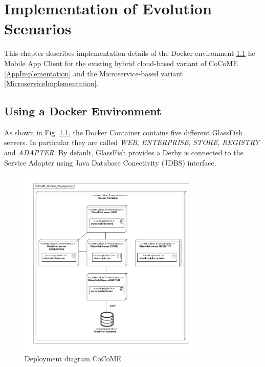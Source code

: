 \chapter{Implementation of Evolution Scenarios}
\label{c:implementation}
This chapter describes implementation details of the Docker environment \ref{DockerImplementation}\deleted{,} 
he Mobile App Client for the existing hybrid cloud-based variant of CoCoME \deleted{(}\ref{AppImplementation}\deleted{)} and the Microservice-based variant \deleted{(}\ref{MicroserviceImplementation}\deleted{)}.


\section{Using a Docker Environment}\label{DockerImplementation}
 	As shown in Fig. \ref*{Deploym_CoCoME}, the Docker Container contains five different GlassFish servers. In particular they are called \textit{WEB}, \textit{ENTERPRISE}, \textit{STORE}, \textit{REGISTRY} and \textit{ADAPTER}. 
 	By default, GlassFish provides a Derby 
 	 is connected to the Service Adapter using  Java Database Conectivity (JDBS) interface.
 	\begin{figure}[h]
 		\centering
 		\includegraphics[width = 0.8\textwidth]{img/docker_Container_Deployment.pdf}
 		\caption{Deployment diagram CoCoME}
 		\label{Deploym_CoCoME}
 	\end{figure}
